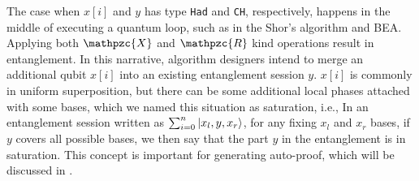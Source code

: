 The case when $x[i]$ and $y$ has type \texttt{Had} and \texttt{CH}, respectively,
happens in the middle of executing a quantum loop, such as in the Shor's algorithm and BEA.
Applying both $\mathpzc{X}$ and $\mathpzc{R}$ kind operations result in entanglement.
In this narrative, algorithm designers intend to
merge an additional qubit $x[i]$ into an existing entanglement session $y$.
$x[i]$ is commonly in uniform superposition,
but there can be some additional local phases attached with some bases,
which we named this situation as saturation, i.e.,
In an entanglement session written as $\sum_{i=0}^n \left\vert{x_l,y,x_r}\right\rangle$,
for any fixing $x_l$ and $x_r$ bases, if $y$ covers all possible bases,
we then say that the part $y$ in the entanglement is in saturation.
This concept is important for generating auto-proof, which will be discussed in .

